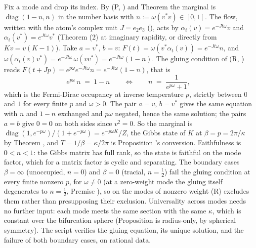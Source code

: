 Fix a mode and drop its index. By (P, ) and Theorem  the marginal is $\operatorname{diag}(1 - n, n)$ in the number basis with $n := \omega(v^{*}v) \in [0,1]$. The flow, written with the atom's complex unit $J = e_{2}e_{3}$ (), acts by $\alpha_t(v) = e^{-Jt\omega}v$ and $\alpha_t(v^{*}) = e^{Jt\omega}v^{*}$ (Theorem (2) at imaginary rapidity, or directly from $Kv = v(K - 1)$). Take $a = v^{*}$, $b = v$: $F(t) = \omega(v^{*}\alpha_t(v)) = e^{-Jt\omega}n$, and $\omega(\alpha_t(v)v^{*}) = e^{-Jt\omega}\,\omega(vv^{*}) = e^{-Jt\omega}(1 - n)$. The gluing condition of (R, ) reads $F(t + Jp) = e^{p\omega}e^{-Jt\omega}n = e^{-Jt\omega}(1 - n)$, that is
\[
e^{p\omega}\,n \;=\; 1 - n \qquad\Longleftrightarrow\qquad n \;=\; \frac{1}{e^{p\omega} + 1} ,
\]
which is the Fermi-Dirac occupancy at inverse temperature $p$, strictly between $0$ and $1$ for every finite $p$ and $\omega > 0$. The pair $a = v$, $b = v^{*}$ gives the same equation with $n$ and $1 - n$ exchanged and $p\omega$ negated, hence the same solution; the pairs $a = b$ give $0 = 0$ on both sides since $v^{2} = 0$. So the marginal is $\operatorname{diag}(1, e^{-p\omega})/(1 + e^{-p\omega}) = e^{-p\omega K}/Z$, the Gibbs state of $K$ at $\beta = p = 2\pi/\kappa$ by Theorem , and $T = 1/\beta = \kappa/2\pi$ is Proposition 's conversion. Faithfulness is $0 < n < 1$: the Gibbs matrix has full rank, so the state is faithful on the mode factor, which for a matrix factor is cyclic and separating. The boundary cases $\beta = \infty$ (unoccupied, $n = 0$) and $\beta = 0$ (tracial, $n = \tfrac12$) fail the gluing condition at every finite nonzero $p$, for $\omega \neq 0$ (at a zero-weight mode the gluing itself degenerates to $n = \tfrac12$, Premise ), so on the modes of nonzero weight (R) excludes them rather than presupposing their exclusion. Universality across modes needs no further input: each mode meets the same section with the same $\kappa$, which is constant over the bifurcation sphere (Proposition  is radius-only, by spherical symmetry). The script verifies the gluing equation, its unique solution, and the failure of both boundary cases, on rational data.
